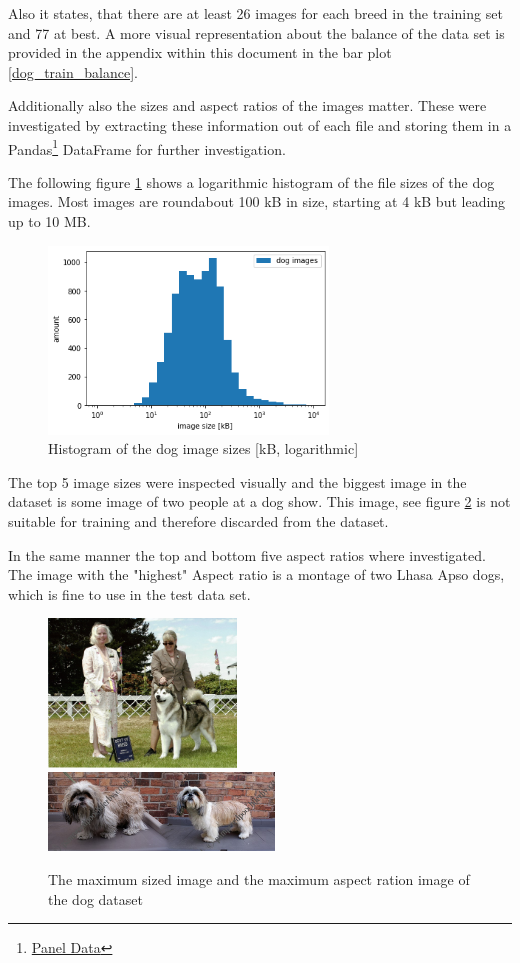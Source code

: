 \documentclass[paper=A4, DIV=10, parskip=half]{scrartcl}
\begin{document}
Also it states, that there are at least 26 images for each
breed in the training set and 77 at best. A more visual representation about the
balance of the data set is provided in the appendix within this document in the
bar plot \ref{dog_train_balance}.

Additionally also the sizes and aspect ratios of the images matter. These were
investigated by extracting these information out of each file and storing them
in a Pandas\footnote{\href{pandas.pydata.org/}{Panel Data}} DataFrame for
further investigation. 

The following figure \ref{dog_image_sizes} shows a logarithmic histogram of the
file sizes of the dog images. Most images are roundabout 100 kB in size,
starting at 4 kB but leading up to 10 MB.

\begin{figure}[H]
  \centering
  \includegraphics[height=5cm]{images/dog_image_sizes.png}
  \caption{Histogram of the dog image sizes [kB, logarithmic]}
  \label{dog_image_sizes}
\end{figure}

The top 5 image sizes were inspected visually and the biggest image in the
dataset is some image of two people at a dog show. This image, see figure
\ref{dog_extreme} is not suitable for training and therefore discarded from the
dataset.

In the same manner the top and bottom five aspect ratios where investigated. The
image with the "highest" Aspect ratio is a montage of two Lhasa Apso dogs, which
is fine to use in the test data set.

\begin{figure}
  \centering
  \includegraphics[width=5cm]{images/Alaskan_malamute_00366.jpg}
  \,
  \includegraphics[width=6cm]{images/Lhasa_apso_06668.jpg}
  \caption{The maximum sized image and the maximum aspect ration image of the dog dataset}
  \label{dog_extreme}
\end{figure}
\end{document}
